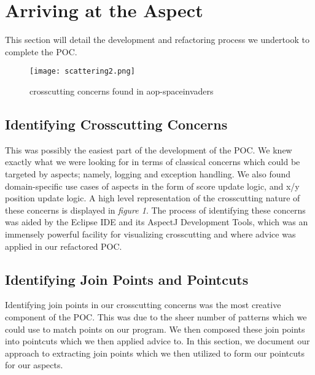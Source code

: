 \documentclass[sigconf]{acmart}
\begin{document}
\section{Arriving at the Aspect}
This section will detail the development and refactoring process we undertook to complete the POC.

 \begin{figure}
    \centering
    \texttt{[image: scattering2.png]}
    \caption{crosscutting concerns found in aop-spaceinvaders}
    \label{fig:1}
\end{figure}

\subsection{Identifying Crosscutting Concerns}
This was possibly the easiest part of the development of the POC. We knew exactly what we were looking for in terms of classical concerns which could be targeted by aspects; namely, logging and exception handling. We also found domain-specific use cases of aspects in the form of score update logic, and x/y position update logic. A high level representation of the crosscutting nature of these concerns is displayed in \textit{figure 1}. The process of identifying these concerns was aided by the Eclipse IDE and its AspectJ Development Tools, which was an immensely powerful facility for visualizing crosscutting and where advice was applied in our refactored POC.

\subsection{Identifying Join Points and Pointcuts}
Identifying join points in our crosscutting concerns was the most creative component of the POC. This was due to the sheer number of patterns which we could use to match points on our program. We then composed these join points into pointcuts which we then applied advice to. In this section, we document our approach to extracting join points which we then utilized to form our pointcuts for our aspects.
\end{document}
